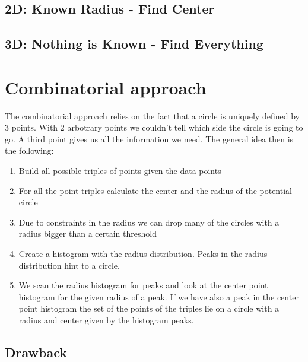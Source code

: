 \documentclass[10pt,twoside]{scrreprt}
\begin{document}
\subsection{2D: Known Radius - Find Center} %
\label{sub:2d_known_radius_find_center}


\subsection{3D: Nothing is Known - Find Everything} %
\label{sub:3d_nothing_is_known_find_everything}


\section{Combinatorial approach}

The combinatorial approach relies on the fact that a circle is uniquely defined by 3 points. With 2 arbotrary points we couldn't tell which side the circle is
going to go. A third point gives us all the information we need. The general idea then is the following:

\begin{enumerate}
\item Build all possible triples of points given the data points
\item For all the point triples calculate the center and the radius of the potential circle
\item Due to constraints in the radius we can drop many of the circles with a radius bigger than a certain threshold
\item Create a histogram with the radius distribution. Peaks in the radius distribution hint to a circle.
\item We scan the radius histogram for peaks and look at the center point histogram for the given radius of a peak. If we have also a peak in the center point histogram
      the set of the points of the triples lie on a circle with a radius and center given by the histogram peaks.
\end{enumerate}

\subsection{Drawback}
	
\end{document}
